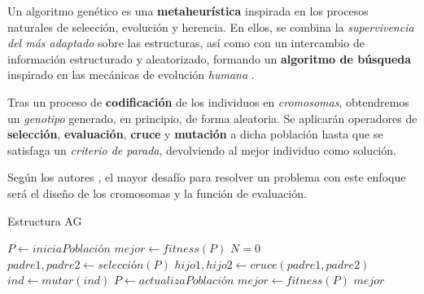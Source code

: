 Un algoritmo genético es una \textbf{metaheurística} inspirada en los procesos naturales de selección, evolución y herencia. En ellos, se combina la \textit{supervivencia del más adaptado} sobre las estructuras, así como con un intercambio de información estructurado y aleatorizado, formando un \textbf{algoritmo de búsqueda} inspirado en las mecánicas de evolución \textit{humana}   \cite{Goldberg1989GeneticLearning}.


Tras un proceso de \textbf{codificación} de los individuos en \textit{cromosomas}, obtendremos un \textit{genotipo} generado, en principio, de forma aleatoria. Se aplicarán operadores de \textbf{selección}, \textbf{evaluación}, \textbf{cruce} y \textbf{mutación} a dicha población hasta que se satisfaga un \textit{criterio de parada}, devolviendo al mejor individuo como solución.

Según los autores \cite{Goldberg1989GeneticLearning, Lin2020AScheduling}, el mayor desafío para resolver un problema con este enfoque será el diseño de los cromosomas y la función de evaluación.

\begin{algorithm}
\caption{Estructura AG}\label{alg:ag}
\begin{algorithmic}
\State $P \gets iniciaPoblación$
\State $mejor \gets fitness(P)$
\State $N = 0$
\State $padre1,padre2 \gets selección(P)$
\State $hijo1,hijo2 \gets cruce(padre1,padre2)$
\EndIf
{}
\State $ind \gets mutar(ind)$
\EndIf
\State $P \gets actualizaPoblación$
\State $mejor \gets fitness(P)$
\EndWhile
\State \Return $mejor$
\end{algorithmic}
\end{algorithm}

